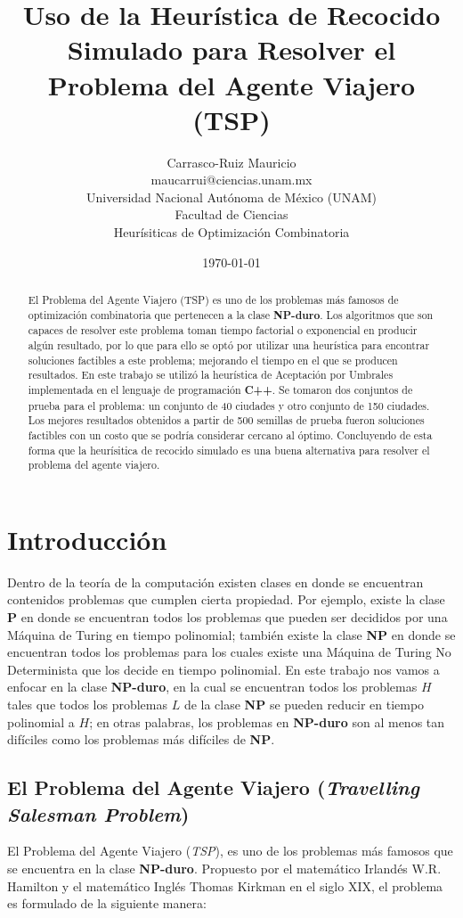 \documentclass{article}
\title{Uso de la Heurística de Recocido Simulado para Resolver
       el Problema del Agente Viajero (TSP)}
\author{Carrasco-Ruiz Mauricio  \\
	maucarrui@ciencias.unam.mx  \\
        Universidad Nacional Autónoma de México (UNAM) \\
        Facultad de Ciencias \\
        Heurísiticas de Optimización Combinatoria \\
	}
\date{\today}
\newcommand{\tbf}[1]{\textbf{#1}}
\newcommand{\tit}[1]{\textit{#1}}
\begin{document}
  \maketitle


  \begin{abstract}
    El Problema del Agente Viajero (TSP) es uno de los problemas 
    más famosos de optimización combinatoria que pertenecen a la 
    clase \tbf{NP-duro}. Los algoritmos que son capaces de resolver
    este problema toman tiempo factorial o exponencial en producir algún 
    resultado, por lo que para ello se optó por utilizar una heurística
    para encontrar soluciones factibles a este problema; mejorando el
    tiempo en el que se producen resultados. En este trabajo se utilizó 
    la heurística de Aceptación por Umbrales implementada en el lenguaje de
    programación \tbf{C++}. Se tomaron dos conjuntos de prueba para 
    el problema: un conjunto de 40 ciudades y otro conjunto de 150 
    ciudades. Los mejores resultados obtenidos a partir de 500 semillas 
    de prueba fueron soluciones factibles con un costo que se podría 
    considerar cercano al óptimo. Concluyendo de esta forma 
    que la heurísitica de recocido simulado es una buena alternativa 
    para resolver el problema del agente viajero.
  \end{abstract}

  \section{Introducción} \label{intro}
  Dentro de la teoría de la computación existen clases en donde 
  se encuentran contenidos problemas que cumplen cierta propiedad. Por ejemplo,
  existe la clase \tbf{P} en donde se encuentran todos los problemas que 
  pueden ser decididos por una Máquina de Turing en tiempo polinomial;
  también existe la clase \tbf{NP} en donde se encuentran todos los 
  problemas para los cuales existe una Máquina de Turing No Determinista que
  los decide en tiempo polinomial. En este trabajo nos vamos a enfocar
  en la clase \tbf{NP-duro}, en la cual se encuentran todos los 
  problemas $H$ tales que todos los problemas $L$ de la clase \tbf{NP} se 
  pueden reducir en tiempo polinomial a $H$; en otras palabras, los problemas
  en \tbf{NP-duro} son al menos tan difíciles como los problemas más difíciles 
  de \tbf{NP}.

  \subsection{El Problema del Agente Viajero (\tit{Travelling Salesman Problem})}
  \label{TSP}
  El Problema del Agente Viajero (\tit{TSP}), es uno de los problemas más 
  famosos que se encuentra en la clase \tbf{NP-duro}. Propuesto por el 
  matemático Irlandés W.R. Hamilton y el matemático Inglés Thomas Kirkman 
  en el siglo XIX, el problema es formulado de la siguiente manera:
\end{document}
